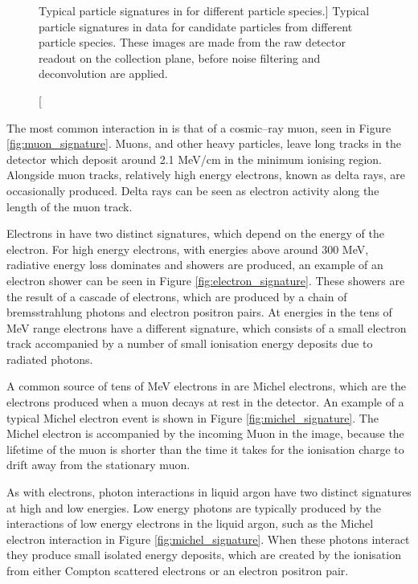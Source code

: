 \begin{figure}
	\caption
	[Typical particle signatures in \protodune{} for different particle 
	species.]
	{Typical particle signatures in \protodune{} data for candidate particles
	from different particle species. These images are made from the raw detector
	readout on the collection plane, before noise filtering and deconvolution are 
	applied. }

	\label{fig:particle_signatures}

\end{figure}

The most common interaction in \protodune{} is that of a cosmic--ray muon, seen
in Figure \ref{fig:muon_signature}. Muons, and other heavy particles, leave 
long tracks in the detector which deposit around 2.1 MeV/cm in the minimum 
ionising region. Alongside muon tracks, relatively high energy electrons, 
known as delta rays, are occasionally produced. Delta rays can be seen as 
electron activity along the length of the muon track.

Electrons in \protodune{} have two distinct signatures, which depend on the
energy of the electron. For high energy electrons, with energies above around
300 MeV, radiative energy loss dominates and showers are produced, an example 
of an electron shower can be seen in Figure \ref{fig:electron_signature}. 
These showers are the result of a cascade of electrons, which are produced by 
a chain of bremsstrahlung photons and electron positron pairs. At energies in 
the tens of MeV range electrons have a different signature, which consists of 
a small electron track accompanied by a number of small ionisation energy 
deposits due to radiated photons. 

A common source of tens of MeV electrons in \protodune{} are Michel electrons, 
which are the electrons produced when a muon decays at rest in the detector. 
An example of a typical Michel electron event is shown in Figure 
\ref{fig:michel_signature}. The Michel electron is accompanied by the incoming 
Muon in the image, because the lifetime of the muon is shorter than the time 
it takes for the ionisation charge to drift away from the stationary muon.

As with electrons, photon interactions in liquid argon have two distinct
signatures at high and low energies. Low energy photons are typically produced
by the interactions of low energy electrons in the liquid argon, such as the
Michel electron interaction in Figure \ref{fig:michel_signature}. When these 
photons interact they produce small isolated energy deposits, which are 
created by the ionisation from either Compton scattered electrons or an electron
positron pair.

